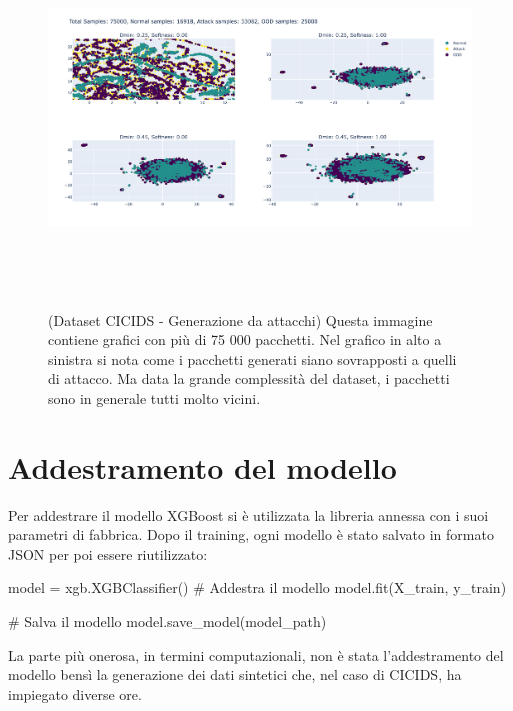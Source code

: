 \begin{figure}[htpb]
    \centering
    \includegraphics[width=\textwidth,height=10cm,keepaspectratio=true]{img/gen_test/cicids/CICIDS18_attack_only_25k.png}
    \caption{
      (Dataset CICIDS - Generazione da attacchi) Questa immagine contiene grafici con più di 75 000 pacchetti. Nel grafico in alto a sinistra si nota come i pacchetti generati siano sovrapposti a quelli di attacco. Ma data la grande complessità del dataset, i pacchetti sono in generale tutti molto vicini.
    }
    \label{fig:gen_CICIDS_attack_2}
\end{figure}



\section{Addestramento del modello}

Per addestrare il modello XGBoost si è utilizzata la libreria annessa con i suoi parametri di fabbrica. Dopo il training, ogni modello è stato salvato in formato JSON per poi essere riutilizzato:

\begin{python}
model = xgb.XGBClassifier()
# Addestra il modello
model.fit(X_train, y_train)

# Salva il modello
model.save_model(model_path)
\end{python}

La parte più onerosa, in termini computazionali, non è stata l'addestramento del modello bensì la generazione dei dati sintetici che, nel caso di CICIDS, ha impiegato diverse ore.

